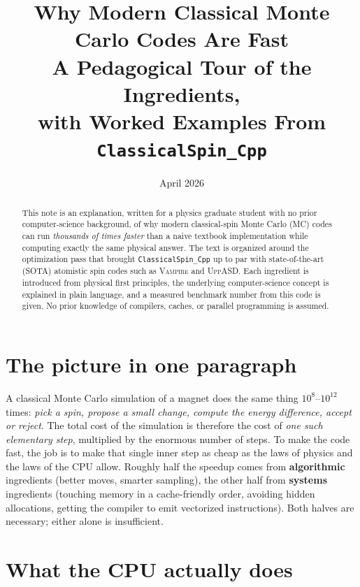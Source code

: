 \documentclass[11pt,letterpaper]{article}
\title{Why Modern Classical Monte Carlo Codes Are Fast\\
       \large A Pedagogical Tour of the Ingredients,\\
              with Worked Examples From \texttt{ClassicalSpin\_Cpp}}
\author{}
\date{April 2026}
\begin{document}
\maketitle

\begin{abstract}
\noindent
This note is an explanation, written for a physics graduate student with no
prior computer-science background, of why modern classical-spin Monte Carlo
(MC) codes can run \emph{thousands of times faster} than a naive textbook
implementation while computing exactly the same physical answer.  The text
is organized around the optimization pass that brought
\texttt{ClassicalSpin\_Cpp} up to par with state-of-the-art (SOTA) atomistic
spin codes such as \textsc{Vampire} and \textsc{UppASD}.  Each ingredient is
introduced from physical first principles, the underlying computer-science
concept is explained in plain language, and a measured benchmark number
from this code is given.  No prior knowledge of compilers, caches, or
parallel programming is assumed.
\end{abstract}

\tableofcontents

\section{The picture in one paragraph}
A classical Monte Carlo simulation of a magnet does the same thing
$10^{8}$--$10^{12}$ times: \emph{pick a spin, propose a small change,
compute the energy difference, accept or reject}.  The total cost of the
simulation is therefore the cost of \emph{one such elementary step},
multiplied by the enormous number of steps.  To make the code fast, the
job is to make that single inner step as cheap as the laws of physics and
the laws of the CPU allow.  Roughly half the speedup comes from
\textbf{algorithmic} ingredients (better moves, smarter sampling), the
other half from \textbf{systems} ingredients (touching memory in a
cache-friendly order, avoiding hidden allocations, getting the compiler to
emit vectorized instructions).  Both halves are necessary; either alone
is insufficient.

\section{What the CPU actually does}
\end{document}
